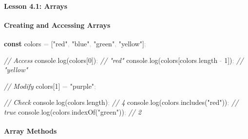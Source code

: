 \documentclass[
  justified,
  openright,
]{tufte-book}
\let\subsection\paragraph
\let\paragraph\paragraph
\newcommand{\KeywordTok}[1]{\textcolor{CodeKeyword}{\textbf{#1}}}  %
\newcommand{\StringTok}[1]{\textcolor{CodeString}{#1}}              %
\newcommand{\CommentTok}[1]{\textcolor{CodeComment}{\textit{#1}}}  %
\newcommand{\CodeNumTok}[1]{\textcolor{CodeNumber}{#1}}             %
\newcommand{\CodeFuncTok}[1]{\textcolor{CodeKeyword}{#1}}           %
\newcommand{\CodeTypeTok}[1]{\textcolor{CodeType}{#1}}              %
\newcommand{\OperatorTok}[1]{\textcolor{DarkGray}{#1}}              %
\newenvironment{Shaded}{%
  \begin{mdframed}[style=TufteCode]%
}{%
  \end{mdframed}%
}
\let\subsection\paragraph
\let\paragraph\paragraph
\begin{document}
\subsection{Lesson 4.1: Arrays}\label{lesson-4.1-arrays}

\subsection{Creating and Accessing
Arrays}\label{creating-and-accessing-arrays}

\begin{Shaded}
\begin{Highlighting}[]
\KeywordTok{const} colors \OperatorTok{=} [\StringTok{"red"}\OperatorTok{,} \StringTok{"blue"}\OperatorTok{,} \StringTok{"green"}\OperatorTok{,} \StringTok{"yellow"}]\OperatorTok{;}
 
\CommentTok{// Access}
console\OperatorTok{.}\CodeFuncTok{log}(colors[\CodeNumTok{0}])\OperatorTok{;} \CommentTok{// "red"}
console\OperatorTok{.}\CodeFuncTok{log}(colors[colors\OperatorTok{.}\CodeTypeTok{length} \OperatorTok{{-}} \CodeNumTok{1}])\OperatorTok{;} \CommentTok{// "yellow"}
 
\CommentTok{// Modify}
colors[\CodeNumTok{1}] \OperatorTok{=} \StringTok{"purple"}\OperatorTok{;}
 
\CommentTok{// Check}
console\OperatorTok{.}\CodeFuncTok{log}(colors\OperatorTok{.}\CodeTypeTok{length})\OperatorTok{;} \CommentTok{// 4}
console\OperatorTok{.}\CodeFuncTok{log}(colors\OperatorTok{.}\CodeFuncTok{includes}(\StringTok{"red"}))\OperatorTok{;} \CommentTok{// true}
console\OperatorTok{.}\CodeFuncTok{log}(colors\OperatorTok{.}\CodeFuncTok{indexOf}(\StringTok{"green"}))\OperatorTok{;} \CommentTok{// 2}
\end{Highlighting}
\end{Shaded}

\subsection{Array Methods}\label{array-methods}
\end{document}
